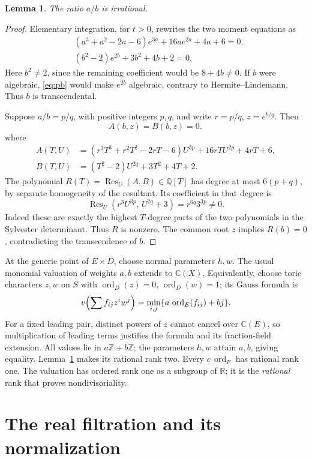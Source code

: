 \documentclass[11pt,a4paper]{article}
\newtheorem{lemma}[theorem]{Lemma}
\newcommand{\C}{\mathbb C}
\newcommand{\Q}{\mathbb Q}
\newcommand{\Z}{\mathbb Z}
\newcommand{\R}{\mathbb R}
\newcommand{\ord}{\operatorname{ord}}
\newcommand{\Res}{\operatorname{Res}}
\begin{document}
\begin{lemma}\label{lem:irrational}
The ratio \(a/b\) is irrational.
\end{lemma}
\begin{proof}
Elementary integration, for \(t>0\), rewrites the two moment equations as
\begin{align}
 &(a^3+a^2-2a-6)e^{3a}+16ae^{2a}+4a+6=0, \label{eq:pa}\\
 &(b^2-2)e^{2b}+3b^2+4b+2=0. \label{eq:pb}
\end{align}
Here \(b^2\neq2\), since the remaining coefficient would be
\(8+4b\neq0\). If \(b\) were algebraic, \eqref{eq:pb} would make
\(e^{2b}\) algebraic, contrary to Hermite--Lindemann. Thus \(b\)
is transcendental.

Suppose \(a/b=p/q\), with positive integers \(p,q\), and write
\(r=p/q\), \(z=e^{b/q}\). Then
\[
 A(b,z)=B(b,z)=0,
\]
where
\begin{align*}
 A(T,U)&=(r^3T^3+r^2T^2-2rT-6)U^{3p}
                           +16rTU^{2p}+4rT+6,\\
 B(T,U)&=(T^2-2)U^{2q}+3T^2+4T+2.
\end{align*}
The polynomial \(R(T)=\Res_U(A,B)\in\Q[T]\) has degree at most
\(6(p+q)\), by separate homogeneity of the resultant.
Its coefficient in that degree is
\[
 \Res_U(r^3U^{3p},\,U^{2q}+3)
       =r^{6q}3^{3p}\neq0 .
\]
Indeed these are exactly the highest \(T\)-degree parts of the
two polynomials in the Sylvester determinant. Thus \(R\) is nonzero.
The common root \(z\) implies \(R(b)=0\), contradicting the
transcendence of \(b\).
\end{proof}

At the generic point of \(E\times D\), choose normal parameters \(h,w\).
The usual monomial valuation of weights \(a,b\) extends to \(\C(X)\).
Equivalently, choose toric characters \(z,w\) on \(S\) with
\(\ord_D(z)=0\), \(\ord_D(w)=1\); its Gauss formula is
\[
 v\Bigl(\sum f_{ij}z^iw^j\Bigr)
       =\min_{i,j}\{a\,\ord_E(f_{ij})+bj\}.
\]
For a fixed leading pair, distinct powers of \(z\) cannot cancel
over \(\C(E)\), so multiplication of leading terms justifies the
formula and its fraction-field extension.
All values lie in \(a\Z+b\Z\); the parameters \(h,w\) attain
\(a,b\), giving equality. Lemma~\ref{lem:irrational} makes its
rational rank two. Every \(c\,\ord_F\) has rational rank one.
The valuation has ordered rank one as a subgroup of \(\R\);
it is the \emph{rational} rank that proves nondivisoriality.

\section{The real filtration and its normalization}
\end{document}
